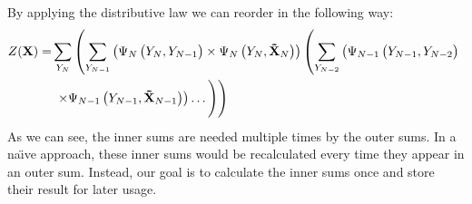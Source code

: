 \bigskip

By applying the distributive law we can reorder  in the following way:
\begin{equation}
  \label{equ:linear-chain-crf-z-distributive}
  \begin{split}
    Z(\mathbf{X}) = & \sum_{Y_N}\left(\sum_{Y_{N-1}}\left(\Psi_N\left(\vphantom{\tilde{X}}Y_N,Y_{N-1}\right)\times\Psi_N\left(Y_N,\mathbf{\tilde{X}}_N\right)\right)\left(\sum_{Y_{N-2}}\left(\Psi_{N-1}\left(\vphantom{\tilde{X}}Y_{N-1},Y_{N-2}\right)\right.\right.\right.\\
    & \left.\left.\left.\times\Psi_{N-1}\left(Y_{N-1},\mathbf{\tilde{X}}_{N-1}\right)\right)\dots\vphantom{\sum_{Y_N}}\right)\right)
  \end{split}
\end{equation}
As we can see, the inner sums are needed multiple times by the outer sums.
In a na\"{\i}ve approach, these inner sums would be recalculated every time they appear in an outer sum.
Instead, our goal is to calculate the inner sums once and store their result for later usage.

\bigskip


